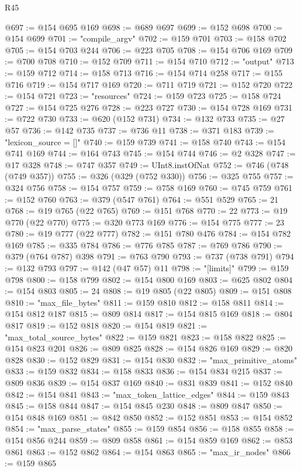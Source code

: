 \begin{lexlean}{R45}
\begin{coremodule}
@697 := @154 @695 @169
@698 := @689 @697
@699 := @152 @698
@700 := @154 @699
@701 := "compile_argv"
@702 := @159 @701
@703 := @158 @702
@705 := @154 @703 @244
@706 := @223 @705
@708 := @154 @706 @169
@709 := @700 @708
@710 := @152 @709
@711 := @154 @710
@712 := "output"
@713 := @159 @712
@714 := @158 @713
@716 := @154 @714 @258
@717 := @155 @716
@719 := @154 @717 @169
@720 := @711 @719
@721 := @152 @720
@722 := @154 @721
@723 := "resources"
@724 := @159 @723
@725 := @158 @724
@727 := @154 @725 @276
@728 := @223 @727
@730 := @154 @728 @169
@731 := @722 @730
@733 := @620 (@152 @731)
@734 := @132 @733
@735 := @27 @57
@736 := @142 @735
@737 := @736 @11
@738 := @371 @183
@739 := "lexicon_source = []"
@740 := @159 @739
@741 := @158 @740
@743 := @154 @741 @169
@744 := @164 @743
@745 := @154 @744
@746 := @2 @328
@747 := @17 @328
@748 := @747 @357
@749 := UInt8.instOfNat
@752 := @746 (@748 (@749 @357))
@755 := @326 (@329 (@752 @330))
@756 := @325 @755
@757 := @324 @756
@758 := @154 @757
@759 := @758 @169
@760 := @745 @759
@761 := @152 @760
@763 := @379 (@547 @761)
@764 := @551 @529
@765 := 21
@768 := @19 @765 (@22 @765)
@769 := @151 @768
@770 := 22
@773 := @19 @770 (@22 @770)
@775 := @320 @773 @169
@776 := @154 @775
@777 := 23
@780 := @19 @777 (@22 @777)
@782 := @151 @780 @476
@784 := @154 @782 @169
@785 := @335 @784
@786 := @776 @785
@787 := @769 @786
@790 := @379 (@764 @787) @398
@791 := @763 @790
@793 := @737 (@738 @791)
@794 := @132 @793
@797 := @142 (@47 @57) @11
@798 := "[limits]"
@799 := @159 @798
@800 := @158 @799
@802 := @154 @800 @169
@803 := @625 @802
@804 := @154 @803
@805 := 24
@808 := @19 @805 (@22 @805)
@809 := @151 @808
@810 := "max_file_bytes"
@811 := @159 @810
@812 := @158 @811
@814 := @154 @812 @187
@815 := @809 @814
@817 := @154 @815 @169
@818 := @804 @817
@819 := @152 @818
@820 := @154 @819
@821 := "max_total_source_bytes"
@822 := @159 @821
@823 := @158 @822
@825 := @154 @823 @201
@826 := @809 @825
@828 := @154 @826 @169
@829 := @820 @828
@830 := @152 @829
@831 := @154 @830
@832 := "max_primitive_atoms"
@833 := @159 @832
@834 := @158 @833
@836 := @154 @834 @215
@837 := @809 @836
@839 := @154 @837 @169
@840 := @831 @839
@841 := @152 @840
@842 := @154 @841
@843 := "max_token_lattice_edges"
@844 := @159 @843
@845 := @158 @844
@847 := @154 @845 @230
@848 := @809 @847
@850 := @154 @848 @169
@851 := @842 @850
@852 := @152 @851
@853 := @154 @852
@854 := "max_parse_states"
@855 := @159 @854
@856 := @158 @855
@858 := @154 @856 @244
@859 := @809 @858
@861 := @154 @859 @169
@862 := @853 @861
@863 := @152 @862
@864 := @154 @863
@865 := "max_ir_nodes"
@866 := @159 @865

\end{coremodule}
\end{lexlean}
